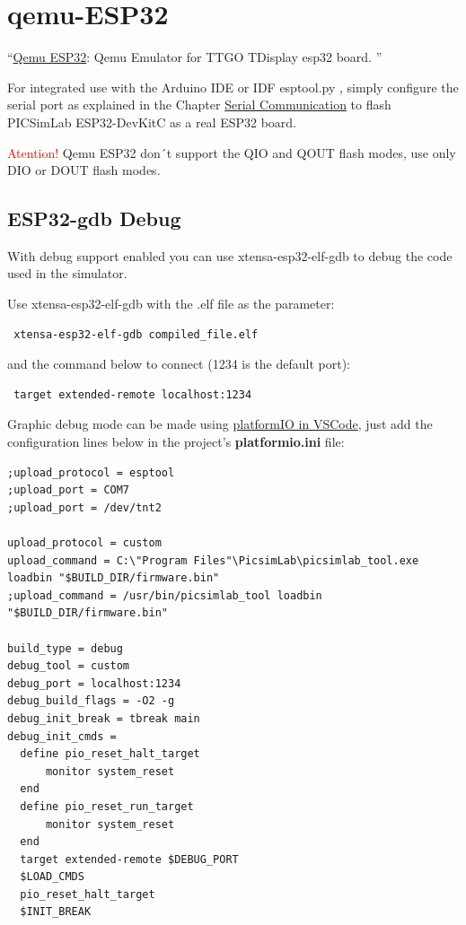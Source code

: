 \section{qemu-ESP32} \hypertarget{def:qemu-esp32}{}
 ``\href{https://github.com/a159x36/qemu}{Qemu ESP32}: Qemu Emulator for TTGO TDisplay esp32 board. ''
  
For integrated use with the Arduino IDE or IDF esptool.py , simply configure the serial port as explained 
in the Chapter \hyperlink{def:seriali}{Serial Communication} to flash PICSimLab ESP32-DevKitC as a real ESP32 board.

 \textcolor{red}{Atention!} Qemu ESP32 don´t support the QIO and QOUT flash modes, use only DIO or DOUT flash modes. 
 
\subsection{ESP32-gdb Debug} \hypertarget{def:gdbesp}{}

 With debug support enabled you can use xtensa-esp32-elf-gdb to debug the code used in the simulator. 
 
 Use xtensa-esp32-elf-gdb with the .elf file as the parameter:
 \begin{verbatim}
 xtensa-esp32-elf-gdb compiled_file.elf
 \end{verbatim}
 and the command below to connect (1234 is the default port):
 \begin{verbatim}
 target extended-remote localhost:1234
 \end{verbatim}

Graphic debug mode can be made using \href{https://platformio.org/}{platformIO in VSCode}, just add the configuration lines below in the project's \textbf{platformio.ini} file:
\begin{verbatim}
;upload_protocol = esptool
;upload_port = COM7
;upload_port = /dev/tnt2

upload_protocol = custom
upload_command = C:\"Program Files"\PicsimLab\picsimlab_tool.exe loadbin "$BUILD_DIR/firmware.bin"
;upload_command = /usr/bin/picsimlab_tool loadbin "$BUILD_DIR/firmware.bin"

build_type = debug
debug_tool = custom
debug_port = localhost:1234
debug_build_flags = -O2 -g
debug_init_break = tbreak main
debug_init_cmds =
  define pio_reset_halt_target
      monitor system_reset
  end
  define pio_reset_run_target
      monitor system_reset
  end
  target extended-remote $DEBUG_PORT
  $LOAD_CMDS
  pio_reset_halt_target
  $INIT_BREAK
\end{verbatim}

